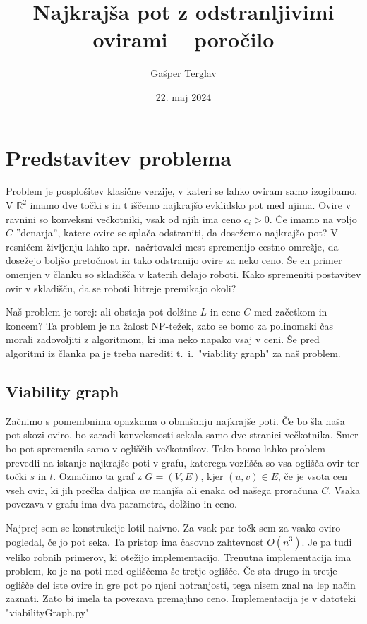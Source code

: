 \documentclass{article}
\author{Gašper Terglav}
\date{22. maj 2024}
\title{Najkrajša pot z odstranljivimi ovirami --  poročilo}
\begin{document}
\maketitle


\section*{Predstavitev problema}

Problem je posplošitev klasične verzije, v kateri se lahko oviram samo izogibamo. V $\mathbb{R}^2$ imamo dve točki s in t iščemo najkrajšo evklidsko pot med njima. Ovire v ravnini so konveksni večkotniki, vsak od njih ima ceno $c_i > 0$. Če imamo na voljo $C$ ''denarja'', katere ovire se splača odstraniti, da dosežemo najkrajšo pot? V resničem življenju lahko npr.\ načrtovalci mest spremenijo cestno omrežje, da dosežejo boljšo pretočnost in tako odstranijo ovire za neko ceno. Še en primer omenjen v članku so skladišča v katerih delajo roboti. Kako spremeniti postavitev ovir v skladišču, da se roboti hitreje premikajo okoli? 

Naš problem je torej: ali obstaja pot dolžine $L$ in cene $C$ med začetkom in koncem? Ta problem je na žalost NP-težek, zato se bomo za polinomski čas morali zadovoljiti z algoritmom, ki ima neko napako vsaj v ceni. Še pred algoritmi iz članka pa je treba narediti t.~i.\ "viability graph" za naš problem.

\subsection*{Viability graph}

Začnimo s pomembnima opazkama o obnašanju najkrajše poti. Če bo šla naša pot skozi oviro, bo zaradi konveksnosti sekala samo dve stranici večkotnika. Smer bo pot spremenila samo v ogliščih večkotnikov. Tako bomo lahko problem prevedli na iskanje najkrajše poti v grafu, katerega vozlišča so vsa oglišča ovir ter točki $s$ in $t$. Označimo ta graf z $G = (V, E)$, kjer $(u,v) \in E$, če je vsota cen vseh ovir, ki jih prečka daljica $uv$ manjša ali enaka od našega proračuna $C$. Vsaka povezava v grafu ima dva parametra, dolžino in ceno. 

Najprej sem se konstrukcije lotil naivno. Za vsak par točk sem za vsako oviro pogledal, če jo pot seka. Ta pristop ima časovno zahtevnost $O(n^3)$. Je pa tudi veliko robnih primerov, ki otežijo implementacijo. Trenutna implementacija ima problem, ko je na poti med ogliščema še tretje oglišče. Če sta drugo in tretje oglišče del iste ovire in gre pot po njeni notranjosti, tega nisem znal na lep način zaznati. Zato bi imela ta povezava premajhno ceno. Implementacija je v datoteki "viabilityGraph.py"
\end{document}
